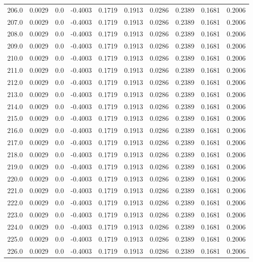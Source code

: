 \begin{longtable}{lrrrrrrrrr}
206.0 & 0.0029 & 0.0 & -0.4003 & 0.1719 & 0.1913 & 0.0286 & 0.2389 & 0.1681 & 0.2006 \\
207.0 & 0.0029 & 0.0 & -0.4003 & 0.1719 & 0.1913 & 0.0286 & 0.2389 & 0.1681 & 0.2006 \\
208.0 & 0.0029 & 0.0 & -0.4003 & 0.1719 & 0.1913 & 0.0286 & 0.2389 & 0.1681 & 0.2006 \\
209.0 & 0.0029 & 0.0 & -0.4003 & 0.1719 & 0.1913 & 0.0286 & 0.2389 & 0.1681 & 0.2006 \\
210.0 & 0.0029 & 0.0 & -0.4003 & 0.1719 & 0.1913 & 0.0286 & 0.2389 & 0.1681 & 0.2006 \\
211.0 & 0.0029 & 0.0 & -0.4003 & 0.1719 & 0.1913 & 0.0286 & 0.2389 & 0.1681 & 0.2006 \\
212.0 & 0.0029 & 0.0 & -0.4003 & 0.1719 & 0.1913 & 0.0286 & 0.2389 & 0.1681 & 0.2006 \\
213.0 & 0.0029 & 0.0 & -0.4003 & 0.1719 & 0.1913 & 0.0286 & 0.2389 & 0.1681 & 0.2006 \\
214.0 & 0.0029 & 0.0 & -0.4003 & 0.1719 & 0.1913 & 0.0286 & 0.2389 & 0.1681 & 0.2006 \\
215.0 & 0.0029 & 0.0 & -0.4003 & 0.1719 & 0.1913 & 0.0286 & 0.2389 & 0.1681 & 0.2006 \\
216.0 & 0.0029 & 0.0 & -0.4003 & 0.1719 & 0.1913 & 0.0286 & 0.2389 & 0.1681 & 0.2006 \\
217.0 & 0.0029 & 0.0 & -0.4003 & 0.1719 & 0.1913 & 0.0286 & 0.2389 & 0.1681 & 0.2006 \\
218.0 & 0.0029 & 0.0 & -0.4003 & 0.1719 & 0.1913 & 0.0286 & 0.2389 & 0.1681 & 0.2006 \\
219.0 & 0.0029 & 0.0 & -0.4003 & 0.1719 & 0.1913 & 0.0286 & 0.2389 & 0.1681 & 0.2006 \\
220.0 & 0.0029 & 0.0 & -0.4003 & 0.1719 & 0.1913 & 0.0286 & 0.2389 & 0.1681 & 0.2006 \\
221.0 & 0.0029 & 0.0 & -0.4003 & 0.1719 & 0.1913 & 0.0286 & 0.2389 & 0.1681 & 0.2006 \\
222.0 & 0.0029 & 0.0 & -0.4003 & 0.1719 & 0.1913 & 0.0286 & 0.2389 & 0.1681 & 0.2006 \\
223.0 & 0.0029 & 0.0 & -0.4003 & 0.1719 & 0.1913 & 0.0286 & 0.2389 & 0.1681 & 0.2006 \\
224.0 & 0.0029 & 0.0 & -0.4003 & 0.1719 & 0.1913 & 0.0286 & 0.2389 & 0.1681 & 0.2006 \\
225.0 & 0.0029 & 0.0 & -0.4003 & 0.1719 & 0.1913 & 0.0286 & 0.2389 & 0.1681 & 0.2006 \\
226.0 & 0.0029 & 0.0 & -0.4003 & 0.1719 & 0.1913 & 0.0286 & 0.2389 & 0.1681 & 0.2006 \\

\end{longtable}
